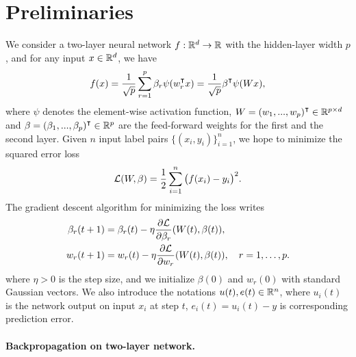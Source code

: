 \section{Preliminaries}

We consider a two-layer neural network $f:\mathbb{R}^d \to \mathbb{R}$ with the hidden-layer width $p$, and for any input $x\in{\mathbb{R}^{d}}$, we have
\begin{align}\label{eqn:nonlinear-network}
    f(x) = \frac{1}{\sqrt p}\sum_{r=1}^p\beta_r\psi(w_r\transpose x)= \frac{1}{\sqrt p}\beta\transpose\psi(Wx),
\end{align}
where $\psi$ denotes the element-wise activation function, $W = (w_1,...,w_p)\transpose\in\Rpd$ and $\beta = (\beta_1,...,\beta_p)\transpose\in\Rp$ are the feed-forward weights for the first and the second layer.
Given $n$ input label pairs $\{(x_i,y_i)\}_{i=1}^n$, we hope to minimize the squared error loss
\begin{equation}
    \mathcal{L}(W,\beta) = \frac{1}{2}\sum_{i=1}^n \big(f(x_i)-y_i\big)^2.
\end{equation}
The gradient descent algorithm for minimizing the loss writes
\begin{align*}
    \beta_r(t+1) &= \beta_r(t)-\eta\frac{\partial\mathcal{L}}{\partial \beta_r}(W(t),\beta(t)), \\
    w_r(t+1) &= w_r(t)-\eta\frac{\partial\mathcal{L}}{\partial w_r}(W(t),\beta(t)), \quad r=1,\ldots,p.
\end{align*}
where $\eta>0$ is the step size, and we initialize $\beta(0)$ and $w_r(0)$ with standard Gaussian vectors. We also introduce the notations $u(t),e(t)\in \mathbb{R}^n$, where $u_i(t)$ is the network output on input $x_i$ at step $t$, $e_i(t) = u_i(t)-y$ is corresponding prediction error.

\paragraph{Backpropagation on two-layer network.}

